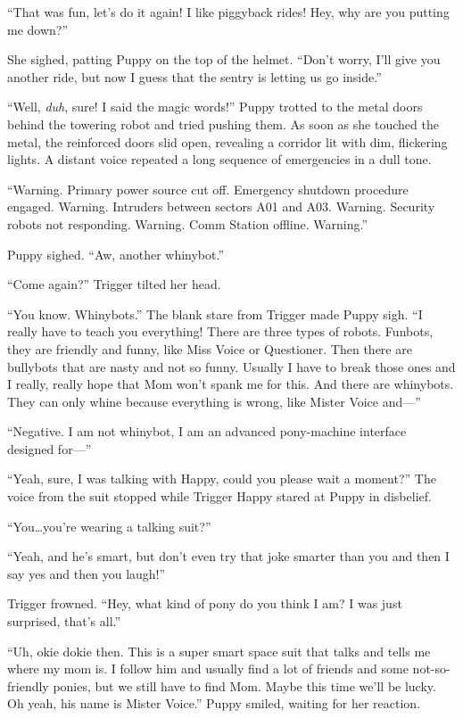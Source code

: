 ``That was fun, let's do it again! I like piggyback rides! Hey, why are you putting me down?''

She sighed, patting Puppy on the top of the helmet. ``Don't worry, I'll give you another ride, but now I guess that the sentry is letting us go inside.''

``Well, \emph{duh}, sure! I said the magic words!'' Puppy trotted to the metal doors behind the towering robot and tried pushing them. As soon as she touched the metal, the reinforced doors slid open, revealing a corridor lit with dim, flickering lights. A distant voice repeated a long sequence of emergencies in a dull tone.

{\mt ``Warning. Primary power source cut off. Emergency shutdown procedure engaged. Warning. Intruders between sectors A01 and A03. Warning. Security robots not responding. Warning. Comm Station offline. Warning.''}

Puppy sighed. ``Aw, another whinybot.''

``Come again?'' Trigger tilted her head.

``You know. Whinybots.'' The blank stare from Trigger made Puppy sigh. ``I really have to teach you everything! There are three types of robots. Funbots, they are friendly and funny, like Miss Voice or Questioner. Then there are bullybots that are nasty and not so funny. Usually I have to break those ones and I really, really hope that Mom won't spank me for this. And there are whinybots. They can only whine because everything is wrong, like Mister Voice and---''

{\mt ``Negative. I am not whinybot, I am an advanced pony-machine interface designed for---''}

``Yeah, sure, I was talking with Happy, could you please wait a moment?'' The voice from the suit stopped while Trigger Happy stared at Puppy in disbelief.

``You\dots you're wearing a talking suit?''

``Yeah, and he's smart, but don't even try that joke smarter than you and then I say yes and then you laugh!''

Trigger frowned. ``Hey, what kind of pony do you think I am? I was just surprised, that's all.''

``Uh, okie dokie then. This is a super smart space suit that talks and tells me where my mom is. I follow him and usually find a lot of friends and some not-so-friendly ponies, but we still have to find Mom. Maybe this time we'll be lucky. Oh yeah, his name is Mister Voice.'' Puppy smiled, waiting for her reaction.

